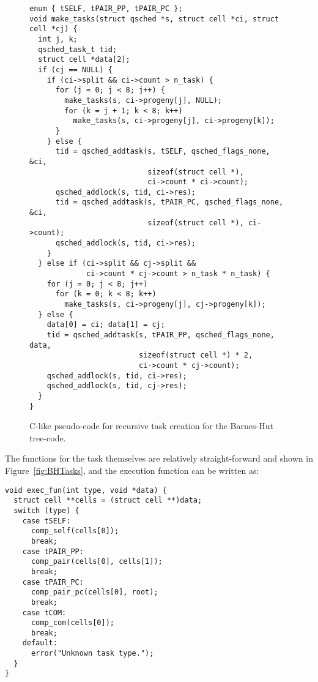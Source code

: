 \documentclass[fleqn,10pt]{wlpeerj}
\newcommand{\fig}[1]
    {Figure~\ref{fig:#1}}
\begin{document}
\begin{figure}
\begin{center}\begin{minipage}{0.9\textwidth}
    \begin{lstlisting}[basicstyle=\scriptsize\tt]
enum { tSELF, tPAIR_PP, tPAIR_PC };
void make_tasks(struct qsched *s, struct cell *ci, struct cell *cj) {
  int j, k;
  qsched_task_t tid;
  struct cell *data[2];
  if (cj == NULL) {
    if (ci->split && ci->count > n_task) {
      for (j = 0; j < 8; j++) {
        make_tasks(s, ci->progeny[j], NULL);
        for (k = j + 1; k < 8; k++)
          make_tasks(s, ci->progeny[j], ci->progeny[k]);
      }
    } else {
      tid = qsched_addtask(s, tSELF, qsched_flags_none, &ci,
                           sizeof(struct cell *),
                           ci->count * ci->count);
      qsched_addlock(s, tid, ci->res);
      tid = qsched_addtask(s, tPAIR_PC, qsched_flags_none, &ci,
                           sizeof(struct cell *), ci->count);
      qsched_addlock(s, tid, ci->res);
    }
  } else if (ci->split && cj->split &&
             ci->count * cj->count > n_task * n_task) {
    for (j = 0; j < 8; j++)
      for (k = 0; k < 8; k++)
        make_tasks(s, ci->progeny[j], cj->progeny[k]);
  } else {
    data[0] = ci; data[1] = cj;
    tid = qsched_addtask(s, tPAIR_PP, qsched_flags_none, data,
                         sizeof(struct cell *) * 2,
                         ci->count * cj->count);
    qsched_addlock(s, tid, ci->res);
    qsched_addlock(s, tid, cj->res);
  }
}
    \end{lstlisting}
\end{minipage}\end{center}
    \caption{C-like pseudo-code for recursive task creation
        for the Barnes-Hut tree-code.}
    \label{fig:MakeTasks}
\end{figure}

The functions for the task themselves are relatively
straight-forward and shown in \fig{BHTasks}, and the
execution function can be written as:
\begin{center}\begin{minipage}{0.9\textwidth}
    \begin{lstlisting}
void exec_fun(int type, void *data) {
  struct cell **cells = (struct cell **)data;
  switch (type) {
    case tSELF:
      comp_self(cells[0]);
      break;
    case tPAIR_PP:
      comp_pair(cells[0], cells[1]);
      break;
    case tPAIR_PC:
      comp_pair_pc(cells[0], root);
      break;
    case tCOM:
      comp_com(cells[0]);
      break;
    default:
      error("Unknown task type.");
  }
}
    \end{lstlisting}
\end{minipage}\end{center}
\end{document}
